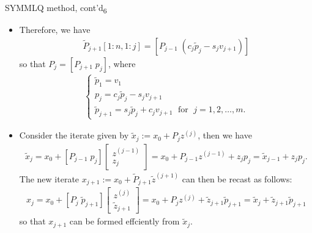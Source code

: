 \documentclass[t,usepdftitle=false]{beamer}
\begin{document}
\begin{frame}{SYMMLQ method, cont'd\textsubscript{6}}
\begin{itemize}
\item[] Therefore, we have
\begin{align*}
\tilde{P}_{j+1}[1:n,1:j]=
[P_{j-1}\;(c_j\tilde{p}_j-s_jv_{j+1})]
\end{align*}
so that $P_j=[P_{j+1}\;p_j]$, where\vspace{-.075cm}
\begin{align*}
\begin{cases}
\tilde{p}_1=v_1\\
p_j=c_j\tilde{p}_j-s_jv_{j+1}\\
\tilde{p}_{j+1}=s_j\tilde{p}_j+c_jv_{j+1}
\;\text{ for }\;j=1,2,\dots,m.
\end{cases}
\end{align*}
\item Consider the iterate given by $\tilde{x}_j:=x_0+P_jz^{(j)}$, then we have\vspace{-.075cm}
\begin{align*}
\tilde{x}_j=
x_0+[P_{j-1}\;p_j]\begin{bmatrix}z^{(j-1)}\\z_j\end{bmatrix}=
x_0+P_{j-1}z^{(j-1)}+z_jp_j=
\tilde{x}_{j-1}+z_jp_j.
\end{align*}
The new iterate $x_{j+1}:=x_0+\tilde{P}_{j+1}\tilde{z}^{(j+1)}$ can then be recast as follows:\vspace{-.075cm}
\begin{align*}
x_j=x_0+[P_j\;\tilde{p}_{j+1}]\begin{bmatrix}z^{(j)}\\\tilde{z}_{j+1}\end{bmatrix}=
x_0+P_jz^{(j)}+\tilde{z}_{j+1}\tilde{p}_{j+1}=
\tilde{x}_j+\tilde{z}_{j+1}\tilde{p}_{j+1}
\end{align*}
so that $x_{j+1}$ can be formed effciently from $\tilde{x}_j$.
\end{itemize}
\end{frame}
\end{document}
